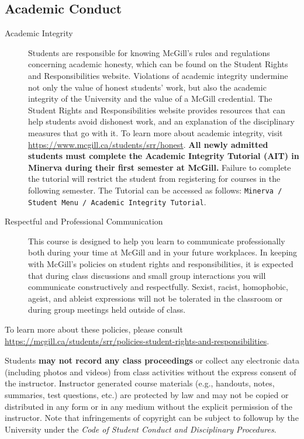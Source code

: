 \documentclass{article}
\begin{document}
\newpage

\subsection{Academic Conduct}

\begin{description} 
\item[Academic Integrity]{Students are responsible for knowing
  McGill's rules and regulations concerning academic honesty, which
  can be found on the Student Rights and Responsibilities
  website. Violations of academic integrity undermine not only the
  value of honest students' work, but also the academic integrity of
  the University and the value of a McGill credential. The Student
  Rights and Responsibilities website provides resources that can help
  students avoid dishonest work, and an explanation of the
  disciplinary measures that go with it. To learn more about academic
  integrity, visit \url{https://www.mcgill.ca/students/srr/honest}.
  {\bf All newly admitted students must complete the Academic
    Integrity Tutorial (AIT) in Minerva during their first semester at
    McGill.} Failure to complete the tutorial will restrict the
  student from registering for courses in the following semester. The
  Tutorial can be accessed as follows: \texttt{Minerva / Student Menu
    / Academic Integrity Tutorial}.}
\item[Respectful and Professional Communication]{This course is
  designed to help you learn to communicate professionally both during
  your time at McGill and in your future workplaces. In keeping with
  McGill's policies on student rights and responsibilities, it is
  expected that during class discussions and small group interactions
  you will communicate constructively and respectfully. Sexist,
  racist, homophobic, ageist, and ableist expressions will not be
  tolerated in the classroom or during group meetings held outside of
  class.}
 \end{description}

To learn more about these policies, please consult 
\url{https://mcgill.ca/students/srr/policies-student-rights-and-responsibilities}.

Students {\bf may not record any class proceedings} or collect any
electronic data (including photos and videos) from class activities
without the express consent of the instructor. Instructor generated
course materials (e.g., handouts, notes, summaries, test questions,
etc.) are protected by law and may not be copied or distributed in any
form or in any medium without the explicit permission of the
instructor. Note that infringements of copyright can be subject to
followup by the University under the {\em Code of Student Conduct and
Disciplinary Procedures}.
\end{document}
